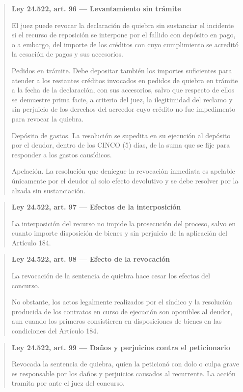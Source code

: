 \documentclass[12pt,oneside]{book}
\newenvironment{articulo}[1]
  {\begin{quote}\small\textbf{#1}\par\smallskip}
  {\end{quote}}
\begin{document}
\begin{articulo}{Ley 24.522, art. 96 --- Levantamiento sin trámite}
El juez puede revocar la declaración de quiebra sin sustanciar el incidente si el recurso de reposición se interpone por el fallido con depósito en pago, o a embargo, del importe de los créditos con cuyo cumplimiento se acreditó la cesación de pagos y sus accesorios.

Pedidos en trámite. Debe depositar también los importes suficientes para atender a los restantes créditos invocados en pedidos de quiebra en trámite a la fecha de la declaración, con sus accesorios, salvo que respecto de ellos se demuestre prima facie, a criterio del juez, la ilegitimidad del reclamo y sin perjuicio de los derechos del acreedor cuyo crédito no fue impedimento para revocar la quiebra.

Depósito de gastos. La resolución se supedita en su ejecución al depósito por el deudor, dentro de los CINCO (5) días, de la suma que se fije para responder a los gastos causídicos.

Apelación. La resolución que deniegue la revocación inmediata es apelable únicamente por el deudor al solo efecto devolutivo y se debe resolver por la alzada sin sustanciación.
\end{articulo}

\begin{articulo}{Ley 24.522, art. 97 --- Efectos de la interposición}
La interposición del recurso no impide la prosecución del proceso, salvo en cuanto importe disposición de bienes y sin perjuicio de la aplicación del Artículo 184.
\end{articulo}

\begin{articulo}{Ley 24.522, art. 98 --- Efecto de la revocación}
La revocación de la sentencia de quiebra hace cesar los efectos del concurso.

No obstante, los actos legalmente realizados por el síndico y la resolución producida de los contratos en curso de ejecución son oponibles al deudor, aun cuando los primeros consistieren en disposiciones de bienes en las condiciones del Artículo 184.
\end{articulo}

\begin{articulo}{Ley 24.522, art. 99 --- Daños y perjuicios contra el peticionario}
Revocada la sentencia de quiebra, quien la peticionó con dolo o culpa grave es responsable por los daños y perjuicios causados al recurrente. La acción tramita por ante el juez del concurso.
\end{articulo}
\end{document}
